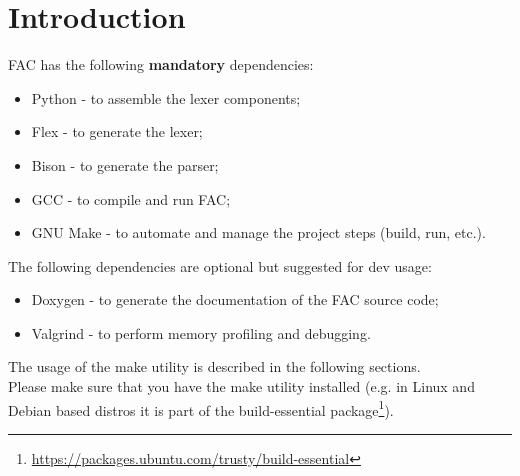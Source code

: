 \section*{Introduction}

FAC has the following \textbf{mandatory} dependencies:
\begin{itemize}
	\item Python - to assemble the lexer components;
	\item Flex - to generate the lexer;
	\item Bison - to generate the parser;
	\item GCC - to compile and run FAC;
	\item GNU Make - to automate and manage the project steps
	(build, run, etc.).
\end{itemize}

The following dependencies are optional but suggested for dev usage:
\begin{itemize}
	\item Doxygen - to generate the documentation of the FAC source code;
	\item Valgrind - to perform memory profiling and debugging.
\end{itemize}

The usage of the make utility is described in the following sections.
\\
Please make sure that you have the make utility installed (e.g. in Linux and
Debian based distros it is part of the build-essential package\footnote{
\url{https://packages.ubuntu.com/trusty/build-essential}}).